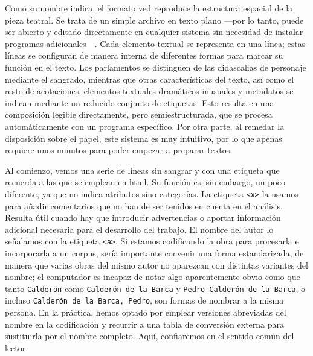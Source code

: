 Como su nombre indica, el formato \ac{ved} reproduce la estructura espacial de la pieza teatral. Se trata de un simple archivo en texto plano —por lo tanto, puede ser abierto y editado directamente en cualquier sistema sin necesidad de instalar programas adicionales—. Cada elemento textual se representa en una línea; estas líneas se configuran de manera interna de diferentes formas para marcar su función en el texto. Los parlamentos se distinguen de las didascalias de personaje mediante el sangrado, mientras que otras características del texto, así como el resto de acotaciones, elementos textuales dramáticos inusuales y metadatos se indican mediante un reducido conjunto de etiquetas. Esto resulta en una composición legible directamente, pero semiestructurada, que se procesa automáticamente con un programa específico. Por otra parte, al remedar la disposición sobre el papel, este sistema es muy intuitivo, por lo que apenas requiere unos minutos para poder empezar a preparar textos.

Al comienzo, vemos una serie de líneas sin sangrar y con una etiqueta que recuerda a las que se emplean en \ac{html}. Su función es, sin embargo, un poco diferente, ya que no indica atributos sino categorías. La etiqueta \texttt{<x>} la usamos para añadir comentarios que no han de ser tenidos en cuenta en el análisis. Resulta útil cuando hay que introducir advertencias o aportar información adicional necesaria para el desarrollo del trabajo. El nombre del autor lo señalamos con la etiqueta \texttt{<a>}. Si estamos codificando la obra para procesarla e incorporarla a un corpus, sería importante convenir una forma estandarizada, de manera que varias obras del mismo autor no aparezcan con distintas variantes del nombre; el computador es incapaz de notar algo aparentemente obvio como que tanto \texttt{Calderón} como \texttt{Calderón de la Barca} y \texttt{Pedro Calderón de la Barca}, o incluso \texttt{Calderón de la Barca, Pedro}, son formas de nombrar a la misma persona. En la práctica, hemos optado por emplear versiones abreviadas del nombre en la codificación y recurrir a una tabla de conversión externa para sustituirla por el nombre completo. Aquí, confiaremos en el sentido común del lector.


